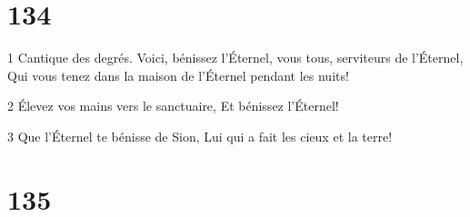 \chapter{134}

\par 1 Cantique des degrés. Voici, bénissez l'Éternel, vous tous, serviteurs de l'Éternel, Qui vous tenez dans la maison de l'Éternel pendant les nuits!
\par 2 Élevez vos mains vers le sanctuaire, Et bénissez l'Éternel!
\par 3 Que l'Éternel te bénisse de Sion, Lui qui a fait les cieux et la terre!

\chapter{135}

